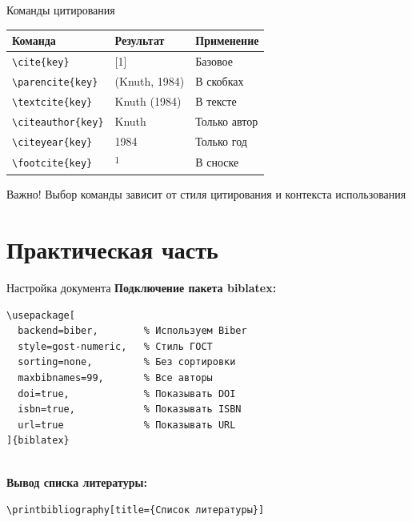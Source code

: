 \documentclass[aspectratio=169, 12pt]{beamer}
\begin{document}
\begin{frame}{Команды цитирования}
  \begin{table}
    \centering
    \small
    \begin{tabular}{@{}lll@{}}
      \toprule
      \textbf{Команда} & \textbf{Результат} & \textbf{Применение} \\
      \midrule
      \verb|\cite{key}| & [1] & Базовое \\
      \verb|\parencite{key}| & (Knuth, 1984) & В скобках \\
      \verb|\textcite{key}| & Knuth (1984) & В тексте \\
      \verb|\citeauthor{key}| & Knuth & Только автор \\
      \verb|\citeyear{key}| & 1984 & Только год \\
      \verb|\footcite{key}| & \textsuperscript{1} & В сноске \\
      \bottomrule
    \end{tabular}
  \end{table}
  
  \vspace{0.5cm}
  
  \begin{alertblock}{Важно!}
    Выбор команды зависит от стиля цитирования и контекста использования
  \end{alertblock}
\end{frame}

\section{Практическая часть}

\begin{frame}[fragile]{Настройка документа}
  \textbf{Подключение пакета biblatex:}
  
  \begin{lstlisting}
\usepackage[
  backend=biber,        % Используем Biber
  style=gost-numeric,   % Стиль ГОСТ
  sorting=none,         % Без сортировки
  maxbibnames=99,       % Все авторы
  doi=true,             % Показывать DOI
  isbn=true,            % Показывать ISBN
  url=true              % Показывать URL
]{biblatex}


  \end{lstlisting}
  
  \vspace{0.3cm}
  
  \textbf{Вывод списка литературы:}
  
  \begin{lstlisting}
\printbibliography[title={Список литературы}]
  \end{lstlisting}
\end{frame}
\end{document}
